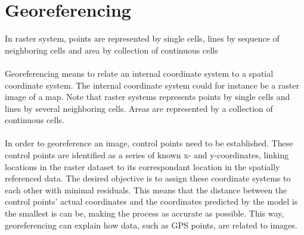 \section{Georeferencing}
In raster system, points are represented by single cells, lines by sequence of neighboring cells and area by collection of continuous cells
\\\\
Georeferencing means to relate an internal coordinate system to a spatial coordinate system. The internal coordinate system could for instance be a raster image of a map. 
Note that raster systems represents points by single cells and lines by several neighboring cells. Areas are represented by a collection of continuous cells. 
\\\\
In order to georeference an image, control points need to be established. These control points are identified as a series of known x- and y-coordinates, linking locations in the raster dataset to its correspondant location in the spatially referenced data. The desired objective is to assign these coordinate systems to each other with minimal residuals. This means that the distance between the control points’ actual coordinates and the coordinates predicted by the model is the smallest is can be, making the process as accurate as possible. This way, georeferencing can explain how data, such as GPS points, are related to images.

